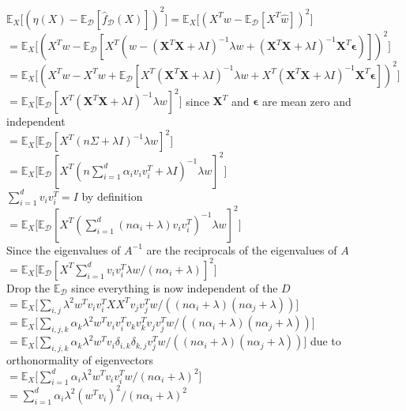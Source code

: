 \documentclass{article}
\newcommand{\1}{\mathbf{1}}
\def\E{\mathbb{E}}
\newcommand{\mb}[1]{\mathbf{#1}}
\newcommand{\mc}[1]{\mathcal{#1}}
\begin{document}
\begin{enumerate}
 $\E_{X}\big[ (\eta(X)-\E_{\mc{D}}[\widehat{f}_{\mc{D}}(X)])^2 \big] =\E_{X}\big[ (X^T w-\E_{\mc{D}}[X^T \widehat{w}])^2 \big] $\\
 $=\E_{X}\big[ (X^T w-\E_{\mc{D}}[X^T( w - (\mb X^T \mb X + \lambda I)^{-1} \lambda w+ (\mb X^T \mb X + \lambda I)^{-1} \mb X^T \boldsymbol{\epsilon})])^2 \big] $\\
 $=\E_{X}\big[ (X^T w-X^T w+\E_{\mc{D}}[X^T (\mb X^T \mb X + \lambda I)^{-1} \lambda w+ X^T (\mb X^T \mb X + \lambda I)^{-1} \mb X^T \boldsymbol{\epsilon}])^2 \big] $\\
 $=\E_{X}\big[ \E_{\mc{D}}[X^T (\mb X^T \mb X + \lambda I)^{-1} \lambda w]^2 \big] $ since $\mb X^T$ and $\boldsymbol{\epsilon}$ are mean zero and independent\\
 $=\E_{X}\big[ \E_{\mc{D}}[X^T (n \Sigma+ \lambda I)^{-1} \lambda w]^2 \big] $\\
  $=\E_{X}\big[ \E_{\mc{D}}[X^T (n \sum_{i=1}^d \alpha_i v_i v_i^T+ \lambda I)^{-1} \lambda w]^2 \big] $\\
  
  $\sum_{i=1}^d v_i v_i^T=I$ by definition \\
  
  $=\E_{X}\big[ \E_{\mc{D}}[X^T (\sum_{i=1}^d (n\alpha_i + \lambda)v_i v_i^T )^{-1} \lambda w]^2 \big] $\\
  
  Since the eigenvalues of $A^{-1}$ are the reciprocals of the eigenvalues of $A$\\
  
   $=\E_{X}\big[ \E_{\mc{D}}[X^T \sum_{i=1}^d v_i v_i^T \lambda w /(n\alpha_i + \lambda) ]^2 \big] $\\
   
   Drop the  $\E_{\mc{D}}$ since everything is now independent of the $D$\\
   
   $=\E_{X}\big[ \sum_{i, j} \lambda^2 w^T v_i v_i^T  X X^T v_j v_j^T w /((n\alpha_i + \lambda)(n\alpha_j + \lambda)) \big] $\\
   $=\E_{X}\big[ \sum_{i, j, k} \alpha_k \lambda^2 w^T v_i v_i^T  v_k v_k^T v_j v_j^T w /((n\alpha_i + \lambda)(n\alpha_j + \lambda)) \big] $\\
   $=\E_{X}\big[ \sum_{i, j, k} \alpha_k \lambda^2 w^T v_i \delta_{i,k} \delta_{k,j} v_j^T w /((n\alpha_i + \lambda)(n\alpha_j + \lambda)) \big] $ due to orthonormality of eigenvectors\\
   $=\E_{X}\big[ \sum_{i=1}^d \alpha_i \lambda^2 w^T v_i v_i^T w /(n\alpha_i + \lambda) ^2\big] $\\
   $= \sum_{i=1}^d \alpha_i \lambda^2 (w^T v_i)^2 /(n\alpha_i + \lambda) ^2 $\\


\end{enumerate}
\end{document}
